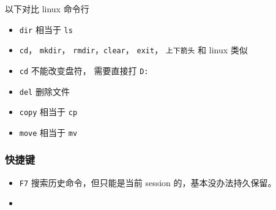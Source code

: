 
以下对比 linux 命令行
\begin{itemize}
\item \verb`dir` 相当于 \verb`ls`
\item \verb`cd`， \verb`mkdir`， \verb`rmdir`，\verb`clear`， \verb`exit`， \verb`上下箭头` 和 linux 类似
\item \verb`cd` 不能改变盘符， 需要直接打 \verb`D:`
\item \verb`del` 删除文件
\item \verb`copy` 相当于 \verb`cp`
\item \verb`move` 相当于 \verb`mv`
\end{itemize}

\subsubsection{快捷键}
\begin{itemize}
\item \verb`F7` 搜索历史命令，但只能是当前 session 的，基本没办法持久保留。
\item 
\end{itemize}
